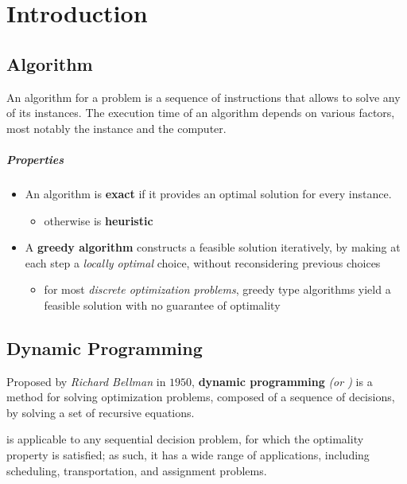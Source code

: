 \documentclass[english]{article}
\begin{document}


\section{Introduction}

\subsection{Algorithm}

An algorithm for a problem is a sequence of instructions that allows to solve any of its instances.
The execution time of an algorithm depends on various factors, most notably the instance and the computer.

\subparagraph*{Properties}

\begin{itemize}
  \item An algorithm is \textbf{exact} if it provides an optimal solution for every instance.
        \begin{itemize}
          \item otherwise is \textbf{heuristic}
        \end{itemize}
  \item A \textbf{greedy algorithm} constructs a feasible solution iteratively, by making at each step a \textit{locally optimal} choice, without reconsidering previous choices
        \begin{itemize}
          \item for most \textit{discrete optimization problems}, greedy type algorithms yield a feasible solution with no guarantee of optimality
        \end{itemize}
\end{itemize}

\subsection{Dynamic Programming}

Proposed by \textit{Richard Bellman} in \(1950\), \textbf{dynamic programming} \textit{(or \DP)} is a method for solving optimization problems, composed of a sequence of decisions, by solving a set of recursive equations.

\DP is applicable to any sequential decision problem, for which the optimality property is satisfied;
as such, it has a wide range of applications, including scheduling, transportation, and assignment problems.
\end{document}
